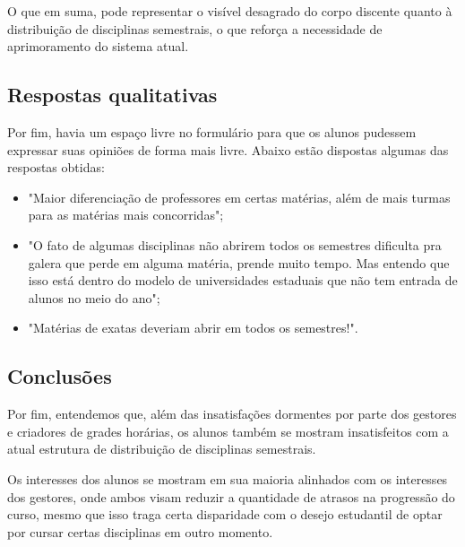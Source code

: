         O que em suma, pode representar o visível desagrado do corpo discente quanto à distribuição de disciplinas semestrais, o que reforça a necessidade de aprimoramento do sistema atual.

    \subsection{Respostas qualitativas} %

        Por fim, havia um espaço livre no formulário para que os alunos pudessem expressar suas opiniões de forma mais livre. Abaixo estão dispostas algumas das respostas obtidas:

        \begin{itemize}
            \item "Maior diferenciação de professores em certas matérias, além de mais turmas para as matérias mais concorridas";
            \item "O fato de algumas disciplinas não abrirem todos os semestres dificulta pra galera que perde em alguma matéria, prende muito tempo. Mas entendo que isso está dentro do modelo de universidades estaduais que não tem entrada de alunos no meio do ano";
            \item "Matérias de exatas deveriam abrir em todos os semestres!".
        \end{itemize}

    \subsection{Conclusões} %

        Por fim, entendemos que, além das insatisfações dormentes por parte dos gestores e criadores de grades horárias, os alunos também se mostram insatisfeitos com a atual estrutura de distribuição de disciplinas semestrais.

        Os interesses dos alunos se mostram em sua maioria alinhados com os interesses dos gestores, onde ambos visam reduzir a quantidade de atrasos na progressão do curso, mesmo que isso traga certa disparidade com o desejo estudantil de optar por cursar certas disciplinas em outro momento.
